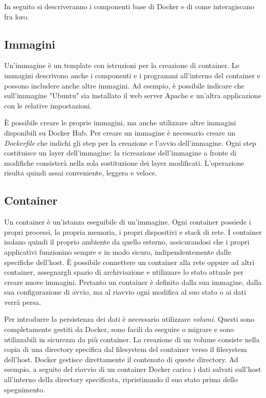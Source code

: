 In seguito si descriveranno i componenti base di Docker e di come interagiscano fra loro.

\subsection{Immagini}
Un'immagine è un template con istruzioni per la creazione di container. Le immagini descrivono anche i componenti e i programmi all'interno del container e possono includere anche altre immagini. Ad esempio, è possibile indicare che sull'immagine "Ubuntu" sia installato il web server Apache e un'altra applicazione con le relative impostazioni.

È possibile creare le proprie immagini, ma anche utilizzare altre immagini disponibili su Docker Hub. Per creare un immagine è necessario creare un \emph{Dockerfile} che indichi gli step per la creazione e l'avvio dell'immagine. Ogni step costituisce un layer dell'immagine: la ricreazione dell'immagine a fronte di modifiche consisterà nella sola sostituzione dei layer modificati. L'operazione risulta quindi assai conveniente, leggera e veloce.

\subsection{Container}
Un container è un'istanza eseguibile di un'immagine. Ogni container possiede i propri processi, la propria memoria, i propri dispositivi e stack di rete. I container isolano quindi il proprio ambiente da quello esterno, assicurandosi che i propri applicativi funzionino sempre e in modo sicuro, indipendentemente dalle specifiche dell'host. È possibile connettere un container alla rete oppure ad altri container, assegnargli spazio di archiviazione e utilizzare lo stato attuale per creare nuove immagini. Pertanto un container è definito dalla sua immagine, dalla sua configurazione di avvio, ma al riavvio ogni modifica al suo stato o ai dati verrà persa.

Per introdurre la persistenza dei dati è necessario utilizzare \emph{volumi}. Questi sono completamente gestiti da Docker, sono facili da eseguire o migrare e sono utilizzabili in sicurezza da più container. La creazione di un volume consiste nella copia di una directory specifica dal filesystem del container verso il filesystem dell'host. Docker gestisce direttamente il contenuto di queste directory. Ad esempio, a seguito del riavvio di un container Docker carica i dati salvati sull'host all'interno della directory specificata, ripristinando il suo stato prima dello spegnimento.

